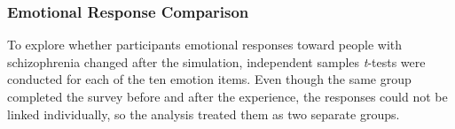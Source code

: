 





\subsubsection{Emotional Response Comparison}

To explore whether participants emotional responses toward people with schizophrenia changed after the simulation, independent samples \textit{t}-tests were conducted for each of the ten emotion items. Even though the same group completed the survey before and after the experience, the responses could not be linked individually, so the analysis treated them as two separate groups.

